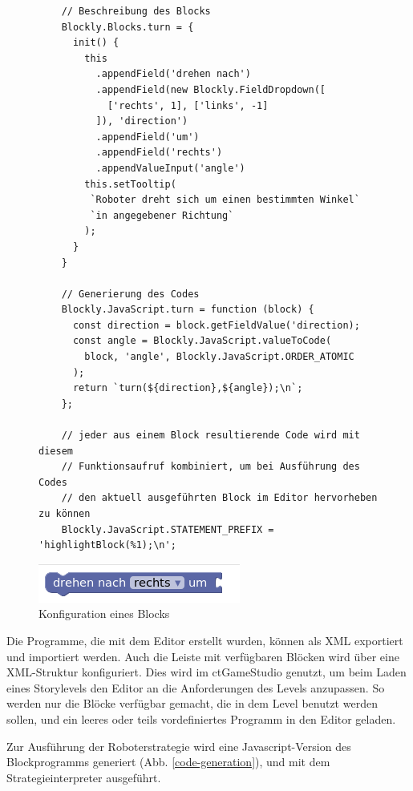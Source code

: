 \begin{figure}
  \begin{lstlisting}
    // Beschreibung des Blocks
    Blockly.Blocks.turn = {
      init() {
        this
          .appendField('drehen nach')
          .appendField(new Blockly.FieldDropdown([
            ['rechts', 1], ['links', -1]
          ]), 'direction')
          .appendField('um')
          .appendField('rechts')
          .appendValueInput('angle')
        this.setTooltip(
         `Roboter dreht sich um einen bestimmten Winkel`
         `in angegebener Richtung`
        );
      }
    }

    // Generierung des Codes
    Blockly.JavaScript.turn = function (block) {
      const direction = block.getFieldValue('direction);
      const angle = Blockly.JavaScript.valueToCode(
        block, 'angle', Blockly.JavaScript.ORDER_ATOMIC
      );
      return `turn(${direction},${angle});\n`;
    };

    // jeder aus einem Block resultierende Code wird mit diesem
    // Funktionsaufruf kombiniert, um bei Ausführung des Codes
    // den aktuell ausgeführten Block im Editor hervorheben zu können
    Blockly.JavaScript.STATEMENT_PREFIX = 'highlightBlock(%1);\n';
  \end{lstlisting}

  \includegraphics{figures/blockly_configuration_turn.png}

  \caption{Konfiguration eines Blocks}

  \label{block-configuration}
\end{figure}

Die Programme, die mit dem Editor erstellt wurden, können als XML exportiert und importiert werden.
Auch die Leiste mit verfügbaren Blöcken wird über eine XML-Struktur konfiguriert. Dies wird im
ctGameStudio genutzt, um beim Laden eines Storylevels den Editor an die Anforderungen des Levels
anzupassen. So werden nur die Blöcke verfügbar gemacht, die in dem Level benutzt werden sollen, und
ein leeres oder teils vordefiniertes Programm in den Editor geladen.

Zur Ausführung der Roboterstrategie wird eine Javascript-Version des Blockprogramms generiert (Abb.
\ref{code-generation}), und mit dem Strategieinterpreter ausgeführt.

